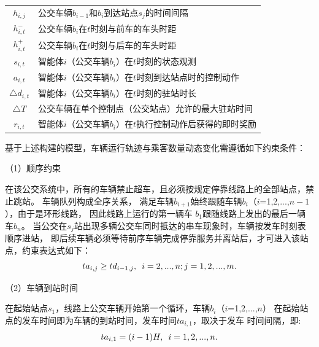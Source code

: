 \begin{table}[!ht]
\begin{tabular}{cp{}}
$h_{i,j}$ & 公交车辆$b_{i-1}$和$b_{i}$到达站点$s_{j}$的时间间隔\\
$h^-_{i,t}$ & 公交车辆$b_{i}$在$t$时刻与前车的车头时距\\
$h^+_{i,t}$ & 公交车辆$b_{i}$在$t$时刻与后车的车头时距\\
$s_{i,t}$ & 智能体$i$（公交车辆$b_{i}$）在$t$时刻的状态观测\\
$a_{i,t}$ & 智能体$i$（公交车辆$b_{i}$）在$t$时刻到达站点时的控制动作\\
$\triangle d_{i,t} $ & 智能体$i$（公交车辆$b_{i}$）在$t$时刻的驻站时长\\
$\triangle T$ & 公交车辆在单个控制点（公交站点）允许的最大驻站时间\\
$r_{i,t}$ & 智能体$i$（公交车辆$b_{i}$）在$t$执行控制动作后获得的即时奖励\\
\bottomrule
\end{tabular}
\end{table}

基于上述构建的模型，车辆运行轨迹与乘客数量动态变化需遵循如下约束条件：

（1）顺序约束

在该公交系统中，所有的车辆禁止超车，且必须按规定停靠线路上的全部站点，禁止跳站。
车辆队列构成全序关系，
满足车辆$b_{i+1}$始终跟随车辆$b_{i}$（$i$=1,2,...,$n-1$），由于是环形线路，
因此线路上运行的第一辆车
$b_{1}$跟随线路上发出的最后一辆车$b_{n}$。
当公交在$s_{j}$站出现多辆公交车同时抵达的串车现象时，车辆按发车时刻表顺序进站，
即后续车辆必须等待前序车辆完成停靠服务并离站后，才可进入该站点，约束表达式如下：
\begin{equation}\label{顺序约束}
    ta_{i,j} \geq td_{i-1,j} ,\hspace{0.5em} i = 2,...,n; j = 1,2,...,m.
\end{equation}

（2）车辆到站时间

在起始站点$s_{1}$，线路上公交车辆开始第一个循环，车辆$b_{i}$（$i$=1,2,...,$n$）
在起始站点的发车时间即为车辆的到站时间，发车时间$ta_{i,1}$，取决于发车
时间间隔，即:
\begin{equation}\label{发车时间间隔}
    ta_{i,1} = (i-1)H,\hspace{0.5em}i = 1,2,...,n.
\end{equation}


